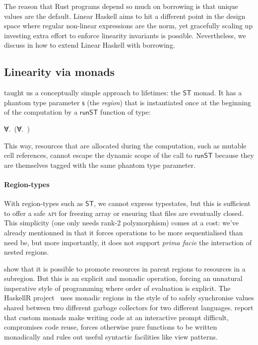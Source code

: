 \documentclass[acmsmall,screen]{acmart}\settopmatter{}
\newcommand{\Conid}[1]{\mathit{#1}}
\newcommand{\Varid}[1]{\mathit{#1}}
\def\resethooks{%
  \global\let\SaveRestoreHook\empty
  \global\let\ColumnHook\empty}
\let\hspre\empty
\let\hspost\empty
\renewcommand\Varid[1]{\mathord{\textsf{#1}}}
\renewcommand\Conid[1]{\mathord{\textsf{#1}}}
\newcommand\HaskeLL{Linear Haskell\xspace{}}
\begin{document}
The reason that Rust programs depend so much on borrowing is that
unique values are the default. \HaskeLL{} aims to hit a different
point in the design space where regular non-linear expressions are the
norm, yet gracefully scaling up investing extra effort to enforce
linearity invariants is possible.
Nevertheless, we discuss in  how to
extend \HaskeLL{} with borrowing.

\subsection{Linearity via monads}

\citet{launchbury_st_1995} taught us
a conceptually simple approach to lifetimes: the \ensuremath{\Conid{ST}} monad. It has
a phantom type parameter \ensuremath{\Varid{s}} (the \emph{region}) that is instantiated once at the
beginning of the computation by a \ensuremath{\Varid{runST}} function of type:
\begin{hscode}\SaveRestoreHook
\column{B}{@{}>{\hspre}l<{\hspost}@{}}%
\column{3}{@{}>{\hspre}l<{\hspost}@{}}%
\column{E}{@{}>{\hspre}l<{\hspost}@{}}%
\>[3]{}\Varid{runST}\mathbin{::}∀\Varid{a}. (∀\Varid{s}. \Conid{ST}\;\Varid{s}\;\Varid{a})\to \Varid{a}{}\<[E]%
\ColumnHook
\end{hscode}\resethooks
This way, resources that are allocated during the computation, such
as mutable cell references, cannot escape the dynamic scope of the call
to \ensuremath{\Varid{runST}} because they are themselves tagged with the same phantom
type parameter.

\paragraph{Region-types}

With region-types such as \ensuremath{\Conid{ST}}, we cannot express typestates, but this
is sufficient to offer a safe \textsc{api} for freezing array or
ensuring that files are eventually closed.
This simplicity (one only needs rank-2 polymorphism)
comes at a cost: we've already mentionned in
 that it forces operations to be more
sequentialised than need be, but more importantly, it does not
support \emph{prima facie} the interaction of nested regions.

\citet{kiselyov_regions_2008} show that it is possible to promote
resources in parent regions to resources in a subregion. But this is
an explicit and monadic operation, forcing an unnatural imperative
style of programming where order of evaluation is explicit.
The HaskellR project~\cite{boespflug_project_2014} uses monadic
regions in the style of \citeauthor{kiselyov_regions_2008} to safely
synchronise values shared between two different garbage collectors for
two different languages.  report
that custom monads make writing code at an interactive prompt
difficult, compromises code reuse, forces otherwise pure functions to
be written monadically and rules out useful syntactic facilities like
view patterns.
\end{document}
